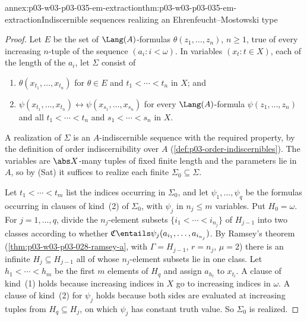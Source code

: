 \begin{annexitem}{annex:p03-w03-p03-035-em-extraction}{thm:p03-w03-p03-035-em-extraction}{Indiscernible sequences realizing an Ehrenfeucht--Mostowski type}
\begin{proof}
Let \(E\) be the set of \(\Lang(A)\)-formulas \(\theta(z_1,\ldots,z_n)\),
\(n\geq1\), true of every increasing \(n\)-tuple of the sequence
\((a_i:i<\omega)\).  In variables \((x_t:t\in X)\), each of the length of the
\(a_i\), let \(\Sigma\) consist of
\begin{enumerate}
  \item \(\theta(x_{t_1},\ldots,x_{t_n})\) for \(\theta\in E\) and
        \(t_1<\cdots<t_n\) in \(X\); and
  \item \(\psi(x_{t_1},\ldots,x_{t_n})\leftrightarrow\psi(x_{s_1},\ldots,x_{s_n})\)
        for every \(\Lang(A)\)-formula \(\psi(z_1,\ldots,z_n)\) and all
        \(t_1<\cdots<t_n\) and \(s_1<\cdots<s_n\) in \(X\).
\end{enumerate}
A realization of \(\Sigma\) is an \(A\)-indiscernible sequence with the
required property, by the definition of order indiscernibility over \(A\)
(\cref{def:p03-order-indiscernibles}).  The variables are \(\abs X\)-many
tuples of fixed finite length and the parameters lie in \(A\), so by (Sat) it
suffices to realize each finite \(\Sigma_0\subseteq\Sigma\).

Let \(t_1<\cdots<t_m\) list the indices occurring in \(\Sigma_0\), and let
\(\psi_1,\ldots,\psi_q\) be the formulas occurring in clauses of kind~(2) of
\(\Sigma_0\), with \(\psi_j\) in \(n_j\leq m\) variables.  Put
\(H_0=\omega\).  For \(j=1,\ldots,q\), divide the \(n_j\)-element subsets
\(\{i_1<\cdots<i_{n_j}\}\) of \(H_{j-1}\) into two classes according to
whether \(\mathfrak C\entails\psi_j(a_{i_1},\ldots,a_{i_{n_j}})\).  By
Ramsey's theorem (\cref{thm:p03-w03-p03-028-ramsey-a}, with
\(\Gamma=H_{j-1}\), \(r=n_j\), \(\mu=2\)) there is an infinite
\(H_j\subseteq H_{j-1}\) all of whose \(n_j\)-element subsets lie in one
class.  Let \(h_1<\cdots<h_m\) be the first \(m\) elements of \(H_q\) and
assign \(a_{h_l}\) to \(x_{t_l}\).  A clause of kind~(1) holds because
increasing indices in \(X\) go to increasing indices in \(\omega\).  A clause
of kind~(2) for \(\psi_j\) holds because both sides are evaluated at
increasing tuples from \(H_q\subseteq H_j\), on which \(\psi_j\) has constant
truth value.  So \(\Sigma_0\) is realized.
\end{proof}
\end{annexitem}

